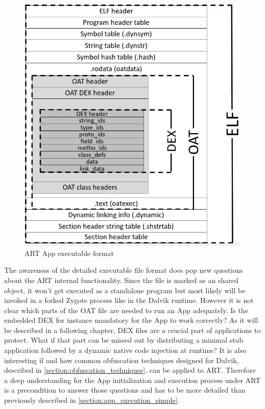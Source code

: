 \begin{figure}[htb]
  \centering
  \includegraphics[scale=0.6]{figures/andelf_format}
  \caption[ART App executable format]{ART App executable format}
  \label{fig:andelf_format}
\end{figure}

The awareness of the detailed executable file format does pop
new questions about the ART internal functionality.
Since the file is marked as an shared object, it won't get
executed as a standalone program but most likely will be
invoked in a forked Zygote process like in the Dalvik runtime.
However it is not clear which parts of the OAT file are
needed to run an App adequately. Is the embedded DEX for instance
mandatory for the App to work correctly? As it will be described
in a following chapter, DEX files are
a crucial part of applications to protect. What if that part
can be missed out by distributing a minimal stub application
followed by a dynamic native code injection at runtime?
It is also interesting if and how common obfuscation
techniques designed for Dalvik, described in \autoref{section:obfuscation_techniques}, can be applied to ART.
Therefore a deep understanding for the App initialization and execution
process under ART is a precondition to answer those
questions and has to be more detailed than previously described in
\autoref{section:app_execution_simple}.

